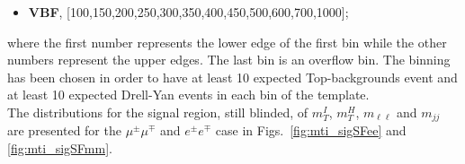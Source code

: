 \begin{itemize}
\item {\bf VBF}, [100,150,200,250,300,350,400,450,500,600,700,1000];
\end{itemize}
where the first number represents the lower edge of the first bin while the other numbers represent the upper edges. The last bin is an overflow bin. 
The binning has been chosen in order to have at least 10 expected Top-backgrounds event and at least 10  expected  Drell-Yan events in each bin of the template.\\
The distributions for the signal region, still blinded, of $m_T^I$,  $m_T^H$,
$m_{\ell \ell}$ and $m_{jj}$ are presented for the $\mu ^{\pm} \mu^{\mp}$ and $e^{\pm} e^{\mp}$ 
case in Figs.~\ref{fig:mti_sigSFee} and \ref{fig:mti_sigSFmm}.




